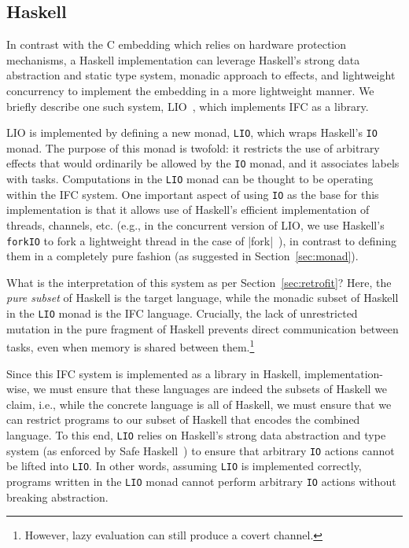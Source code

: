 \subsection{Haskell}
\label{sec:real:hs}
In contrast with the C embedding which relies on hardware protection
mechanisms, a Haskell implementation can leverage Haskell's strong data
abstraction and static type system, monadic approach to effects, and
lightweight concurrency to implement the embedding in a more lightweight
manner.  We briefly describe one such system, LIO~\cite{lio}, which
implements IFC as a library.

LIO is implemented by defining a new monad, \verb|LIO|, which wraps Haskell's \verb|IO|
monad.
%
The purpose of this monad is twofold: it restricts the use of
arbitrary effects that would ordinarily be allowed by the \verb|IO| monad,
and it associates labels with tasks.
%
Computations in the \verb|LIO|
monad can be thought to be operating within the IFC system.
%
One important aspect of using \verb|IO| as the base for this
implementation is that it allows use of Haskell's efficient
implementation of threads, channels, etc. (e.g., in the concurrent
version of LIO, we use Haskell's \texttt{forkIO} to fork a lightweight
thread in the case of |fork|~\cite{stefan:addressing-covert}), in
contrast to defining them in a completely pure fashion (as suggested
in Section~\ref{sec:monad}).

What is the interpretation of this system as per Section~\ref{sec:retrofit}?
%
Here, the \emph{pure subset} of Haskell is the target language, while
the monadic subset of Haskell in the \verb|LIO| monad is the IFC
language.
%
Crucially, the lack of unrestricted mutation in the pure fragment of
Haskell prevents direct communication between tasks, even when memory is
shared between them.\footnote{However, lazy evaluation can still produce
a covert channel.}

Since this IFC system is implemented as a library in Haskell,
implementation-wise, we must ensure that these languages are indeed the subsets of Haskell
we claim, i.e., while the concrete language is all of Haskell, we must
ensure that we can restrict programs to our subset of Haskell that
encodes the combined language.
%
To this end, \verb|LIO| relies on Haskell's strong data abstraction and type system
(as enforced by Safe Haskell~\cite{Terei:2012:SH:2364506.2364524}) to
ensure that arbitrary \verb|IO| actions cannot be lifted into
\verb|LIO|.
%
In other words, assuming \verb|LIO| is implemented correctly, programs
written in the \verb|LIO| monad cannot perform arbitrary \verb|IO| actions
without breaking abstraction.

